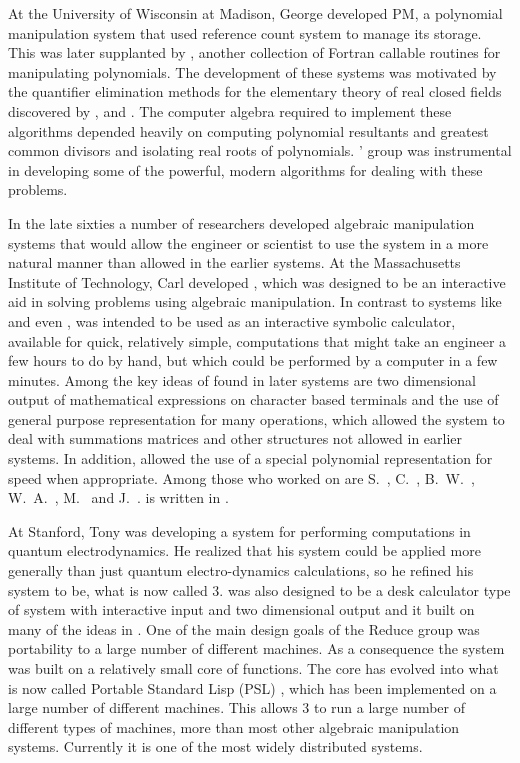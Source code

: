 At the University of Wisconsin at Madison, George {\Collins} developed
PM, a polynomial manipulation system that used reference count system
to manage its storage.  This was later supplanted by , another
collection of Fortran callable routines for manipulating polynomials.
The development of these systems was motivated by the quantifier
elimination methods for the elementary theory of real closed fields
discovered by {\Tarski} \cite{Tarski1951-qv}, {\Seidenberg} \cite{Seidenberg1954-tu} and {\CohenP} \cite{Cohen1969-lw}.  The computer algebra required to
implement these algorithms depended heavily on computing polynomial
resultants and greatest common divisors and isolating real roots of
polynomials.  {\Collins}' group was instrumental in developing some of
the powerful, modern algorithms for dealing with these problems.

\smallskip

In the late sixties a number of researchers developed algebraic
manipulation systems that would allow the engineer or scientist to use
the system in a more natural manner than allowed in the earlier
systems.  At the Massachusetts Institute of Technology, Carl
{\Engleman} developed {\Mathlab}, which was designed to be an
interactive aid in solving problems using algebraic manipulation.  In
contrast to systems like {\Sac} and even {\Altran}, {\Mathlab} was
intended to be used as an interactive symbolic calculator, available
for quick, relatively simple, computations that might take an engineer
a few hours to do by hand, but which could be performed by a computer
in a few minutes.  Among the key ideas of {\Mathlab} found in later
systems are two dimensional output of mathematical expressions on
character based terminals and the use of general purpose
representation for many operations, which allowed the system to deal
with summations matrices and other structures not allowed in earlier
systems.  In addition, {\Mathlab} allowed the use of a special
polynomial representation for speed when appropriate.  Among those who
worked on {\Mathlab} are S.~{\BloomS}, C.~{\Engleman},
B.~W.~{\Diffie}, W.~A.~{\MartinW}, M.~{\Manove} and J.~{\MosesJ}.
{\Mathlab} is written in {\Lisp}.

At Stanford, Tony {\Hearn} was developing a system for performing
computations in quantum electrodynamics.  He realized that his system
could be applied more generally than just quantum electro-dynamics
calculations, so he refined his system to be, what is now called
{\Reduce} 3.  {\Reduce} was also designed to be a desk calculator type
of system with interactive input and two dimensional output and it
built on many of the ideas in {\Mathlab}.  One of the main design
goals of the Reduce group was portability to a large number of
different machines.  As a consequence the system was built on a
relatively small core of {\Lisp} functions.  The core has evolved into
what is now called Portable Standard Lisp (PSL) \cite{Marti1980-og}, which has been implemented on a large
number of different machines.  This allows {\Reduce} 3 to run a large
number of different types of machines, more than most other algebraic
manipulation systems.  Currently it is one of the most widely
distributed systems.


